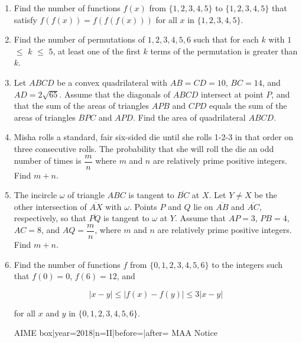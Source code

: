 \documentclass{article}
\begin{document}
\begin{enumerate}[label=\arabic*., itemsep=0.5em]
\par \vspace{0.5em}\item Find the number of functions \(f(x)\) from \(\{1, 2, 3, 4, 5\}\) to \(\{1, 2, 3, 4, 5\}\) that satisfy \(f(f(x)) = f(f(f(x)))\) for all \(x\) in \(\{1, 2, 3, 4, 5\}\).\par \vspace{0.5em}\item Find the number of permutations of \(1, 2, 3, 4, 5, 6\) such that for each \(k\) with \(1\) \(\leq\) \(k\) \(\leq\) \(5\), at least one of the first \(k\) terms of the permutation is greater than \(k\).\par \vspace{0.5em}\item Let \(ABCD\) be a convex quadrilateral with \(AB = CD = 10\), \(BC = 14\), and \(AD = 2\sqrt{65}\). Assume that the diagonals of \(ABCD\) intersect at point \(P\), and that the sum of the areas of triangles \(APB\) and \(CPD\) equals the sum of the areas of triangles \(BPC\) and \(APD\). Find the area of quadrilateral \(ABCD\).\par \vspace{0.5em}\item Misha rolls a standard, fair six-sided die until she rolls 1-2-3 in that order on three consecutive rolls. The probability that she will roll the die an odd number of times is \(\dfrac{m}{n}\) where \(m\) and \(n\) are relatively prime positive integers. Find \(m+n\).\par \vspace{0.5em}\item The incircle \(\omega\) of triangle \(ABC\) is tangent to \(\overline{BC}\) at \(X\). Let \(Y \neq X\) be the other intersection of \(\overline{AX}\) with \(\omega\). Points \(P\) and \(Q\) lie on \(\overline{AB}\) and \(\overline{AC}\), respectively, so that \(\overline{PQ}\) is tangent to \(\omega\) at \(Y\). Assume that \(AP = 3\), \(PB = 4\), \(AC = 8\), and \(AQ = \dfrac{m}{n}\), where \(m\) and \(n\) are relatively prime positive integers. Find \(m+n\).\par \vspace{0.5em}\item Find the number of functions \(f\) from \(\{0, 1, 2, 3, 4, 5, 6\}\) to the integers such that \(f(0) = 0\), \(f(6) = 12\), and


\begin{equation*}
|x - y|  \leq  |f(x) - f(y)|  \leq  3|x - y|
\end{equation*}


for all \(x\) and \(y\) in \(\{0, 1, 2, 3, 4, 5, 6\}\).



{{AIME box|year=2018|n=II|before=|after=}}
{{MAA Notice}}\par \vspace{0.5em}\end{enumerate}
\end{document}
